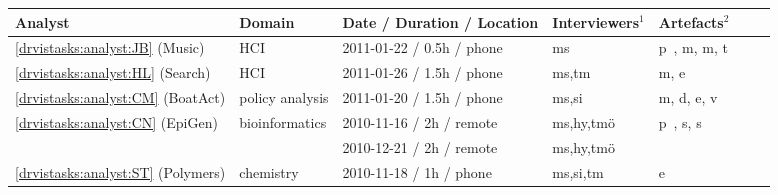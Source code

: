 \begin{table}\renewcommand{\arraystretch}{1.2}\addtolength{\tabcolsep}{-1pt}
	\begin{center}
    \tiny
    \begin{tabular}{ | l | l | l | l | l | l | l |} 
    
        \hline
        \rowcolor{blue!15}
        Analyst & Domain & Date / Duration / Location & Interviewers$^{1}$ & Artefacts$^{2}$ 
        
        \\ 
        
        \hline
        
        \ref{drvistasks:analyst:JB} ({\sc Music}) & \ac{HCI}\index{human-computer interaction (HCI)} & 2011-01-22 / 0.5h / phone & {\sc ms} & p~\cite{Baur2012}, m, m, t~\cite{Buttgen2010}
        
        \\
        
        \rowcolor{gray!15}
        
        \ref{drvistasks:analyst:HL} ({\sc Search}) & \ac{HCI}\index{human-computer interaction (HCI)} & 2011-01-26 / 1.5h / phone & {\sc ms,tm} & m, e
        
        \\
        
        \ref{drvistasks:analyst:CM} ({\sc BoatAct}) & policy analysis\index{policy analysis} & 2011-01-20 / 1.5h / phone & {\sc ms,si} & m, d, e, v
        
        \\
        
        \rowcolor{gray!15}
        
        \ref{drvistasks:analyst:CN} ({\sc EpiGen}) & bioinformatics\index{bioinformatics} & 2010-11-16 / 2h / remote & {\sc ms,hy,tm\"{o}} & p~\cite{Nielsen2009}, s, s
        
        \\
        
        \rowcolor{gray!15}
        
        &  & 2010-12-21 / 2h / remote & {\sc ms,hy,tm\"{o}} & 
        
        \\
        
        \ref{drvistasks:analyst:ST} ({\sc Polymers}) & chemistry\index{chemistry} & 2010-11-18 / 1h / phone & {\sc ms,si,tm} & e 
        
        \\
        

\end{tabular}
\end{center}
\end{table}
